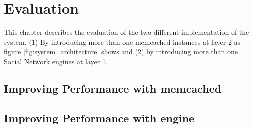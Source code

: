 \chapter{Evaluation}
\label{chapt:evaluation}

This chapter describes the evaluation of the two different implementation of the system. (1) By introducing more than one memcached instances at layer 2 as figure \ref{fig:system_architecture} shows and (2) by introducing more than one Social Network engines at layer 1.

\section{Improving Performance with memcached}
\label{sec:eval_memcache}

\section{Improving Performance with engine}

